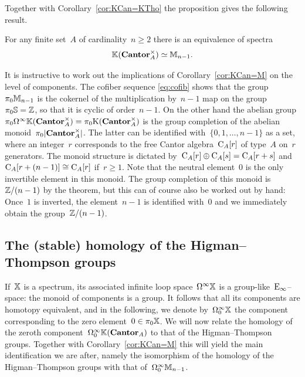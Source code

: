 Together with Corollary~\ref{cor:KCan=KTho} the proposition gives the following result.

\begin{corollary}\label{cor:KCan=M}
For any finite set~$A$ of cardinality~$n\geqslant 2$ there is an equivalence of spectra
\[
\mathbb{K}(\mathbf{Cantor}_A^\times)\simeq\mathbb{M}_{n-1}.
\]
\end{corollary}

\begin{remark}\label{rem:components}
It is instructive to work out the implications of Corollary~\ref{cor:KCan=M} on the level of components. The cofiber sequence \eqref{eq:cofib} shows that the group~$\pi_0\mathbb{M}_{n-1}$ is the cokernel of the multiplication by~$n-1$ map on the group~$\pi_0\mathbb{S}=\mathbb{Z}$, so that it is cyclic of order~\hbox{$n-1$}. On the other hand the abelian group~\hbox{$\pi_0\Omega^\infty\mathbb{K}(\mathbf{Cantor}_A^\times)=\pi_0\mathrm{K}(\mathbf{Cantor}_A^\times)$} is the group completion of the abelian monoid~$\pi_0|\mathbf{Cantor}_A^\times|$. The latter can be identified with~$\{0,1,\dots,n-1\}$ as a set, where an integer~$r$ corresponds to the free Cantor algebra~$\mathrm{C}_{A}[r]$ of type~$A$ on~$r$ generators. The monoid structure is dictated by~$\mathrm{C}_{A}[r]\oplus\mathrm{C}_{A}[s]=\mathrm{C}_A[r+s]$ and~$\mathrm{C}_A[r+(n-1)]\cong\mathrm{C}_A[r]$ if~$r\geqslant1$. Note that the neutral element~$0$ is the only invertible element in this monoid. The group completion of this monoid is~$\mathbb{Z}/(n-1)$ by the theorem, but this can of course also be worked out by hand: Once~$1$ is inverted, the element~$n-1$ is identified with~$0$ and we immediately obtain the group~$\mathbb{Z}/(n-1)$. 
\end{remark}

\subsection{The (stable) homology of the Higman--Thompson groups}

If~$\mathbb{X}$ is a spectrum, its associated infinite loop space~$\Omega^\infty\mathbb{X}$ is a group-like~$\mathrm{E}_\infty$--space: the monoid of components is a group. 
It follows that all its components are homotopy equivalent, and in the following, we denote by~$\Omega_0^\infty\mathbb{X}$ the component corresponding to the zero element~$0\in\pi_0\mathbb{X}$. 
We will now relate the homology of the zeroth component~$\Omega_0^\infty\mathbb{K}(\mathbf{Cantor}_A)$ to that of the Higman--Thompson groups. 
Together with  Corollary~\ref{cor:KCan=M} this will yield the main identification we are after, namely the isomorphism of the homology of the Higman--Thompson groups with that of~$\Omega_0^\infty\mathbb{M}_{n-1}$.

